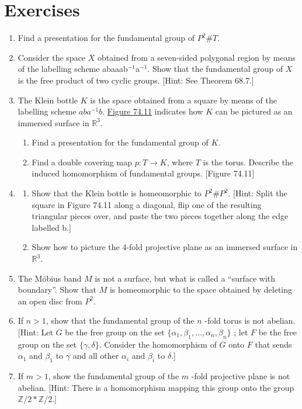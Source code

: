 \section*{Exercises}
\begin{enumerate}[itemsep=0.4em, parsep=0pt, topsep=0pt, partopsep=0pt, leftmargin=*, label=\arabic*., ref=\arabic*]
\item Find a presentation for the fundamental group of \(P^{2}\# T\).
\item Consider the space \(X\) obtained from a seven-sided polygonal region by means of the labelling scheme abaaab\(^{-1}\)a\(^{-1}\). Show that the fundamental group of \(X\) is the free product of two cyclic groups. [Hint: See Theorem 68.7.]
\item The Klein bottle \(K\) is the space obtained from a square by means of the labelling scheme \({ab}a^{-1}b\). \hyperref[fig:74.11]{Figure 74.11} indicates how \(K\) can be pictured as an immersed surface in \(\mathbb{R}^{3}\).
 \begin{enumerate}[itemsep=0.2em, parsep=0pt, topsep=0pt, partopsep=0pt, leftmargin=*, label=(\alph*), align=left]
 \item Find a presentation for the fundamental group of \(K\).
 \item Find a double covering map \(p : T \rightarrow K\), where \(T\) is the torus. Describe the induced homomorphism of fundamental groups. [Figure 74.11]
 \end{enumerate}
\item
 \begin{enumerate}[itemsep=0.2em, parsep=0pt, topsep=0pt, partopsep=0pt, leftmargin=*, label=(\alph*), align=left]
 \item Show that the Klein bottle is homeomorphic to \(P^{2}\# P^{2}\). [Hint: Split the square in Figure 74.11 along a diagonal, flip one of the resulting triangular pieces over, and paste the two pieces together along the edge labelled b.]

 \item Show how to picture the 4-fold projective plane as an immersed surface in \(\mathbb{R}^{3}\).
 \end{enumerate}
\item The Möbius band \(M\) is not a surface, but what is called a ``surface with boundary''. Show that \(M\) is homeomorphic to the space obtained by deleting an open disc from \(P^{2}\).
\item If \(n > 1\), show that the fundamental group of the \(n\) -fold torus is not abelian. [Hint: Let \(G\) be the free group on the set \(\{ {{\alpha }_{1},{\beta }_{1},\ldots ,{\alpha }_{n},{\beta }_{n}}\}\) ; let \(F\) be the free group on the set \(\{ \gamma ,\delta \}\). Consider the homomorphism of \(G\) onto \(F\) that sends \({\alpha }_{1}\) and \({\beta }_{1}\) to \(\gamma\) and all other \({\alpha }_{i}\) and \({\beta }_{i}\) to \(\delta\).]
\item If \(m > 1\), show the fundamental group of the \(m\) -fold projective plane is not abelian. [Hint: There is a homomorphism mapping this group onto the group \({\mathbb{Z}/2 * \mathbb{Z}/2}\).]
\end{enumerate}

